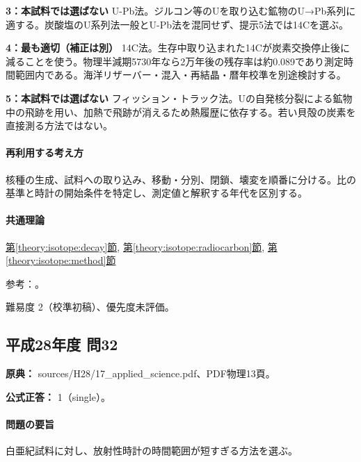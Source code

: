 \noindent\textbf{3：本試料では選ばない} U-Pb法。ジルコン等のUを取り込む鉱物のU→Pb系列に適する。炭酸塩のU系列法一般とU-Pb法を混同せず、提示5法では14Cを選ぶ。\par

\noindent\textbf{4：最も適切（補正は別）} 14C法。生存中取り込まれた14Cが炭素交換停止後に減ることを使う。物理半減期5730年なら2万年後の残存率は約0.089であり測定時間範囲内である。海洋リザーバー・混入・再結晶・暦年校準を別途検討する。\par

\noindent\textbf{5：本試料では選ばない} フィッション・トラック法。Uの自発核分裂による鉱物中の飛跡を用い、加熱で飛跡が消えるため熱履歴に依存する。若い貝殻の炭素を直接測る方法ではない。\par

\paragraph{再利用する考え方} 核種の生成、試料への取り込み、移動・分別、閉鎖、壊変を順番に分ける。比の基準と時計の開始条件を特定し、測定値と解釈する年代を区別する。

\paragraph{共通理論} \hyperref[theory:isotope:decay]{第\ref*{theory:isotope:decay}節}, \hyperref[theory:isotope:radiocarbon]{第\ref*{theory:isotope:radiocarbon}節}, \hyperref[theory:isotope:method]{第\ref*{theory:isotope:method}節}

\par 参考：\cite{iso_radiometric,iso_shell}。

\par 難易度 2（校準初稿）、優先度未評価。

\subsection{平成28年度 問32}
\label{q:h28-reg-applied-32}

\noindent\textbf{原典：} sources/H28/17\_applied\_science.pdf、PDF物理13頁。

\textbf{公式正答：} 1（single）。

\paragraph{問題の要旨} 白亜紀試料に対し、放射性時計の時間範囲が短すぎる方法を選ぶ。

